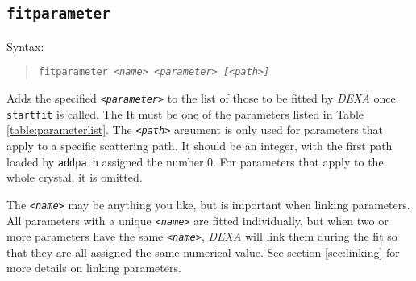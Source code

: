 \documentclass[a4paper,12pt]{report}
\newcommand{\dexa}{\emph{DEXA} }
\begin{document}
\subsection{\texttt{fitparameter}}
Syntax:
\begin{quote}
  \texttt{fitparameter \emph{<name> <parameter> [<path>]}}
\end{quote}
Adds the specified \texttt{\emph{<parameter>}} to the list of those to be fitted by \dexa once \verb|startfit| is called. The  It must be one of the parameters listed in Table \ref{table:parameterlist}. The \texttt{\emph{<path>}} argument is only used for parameters that apply to a specific scattering path. It should be an integer, with the first path loaded by \verb|addpath| assigned the number 0. For parameters that apply to the whole crystal, it is omitted.

The \texttt{\emph{<name>}} may be anything you like, but is important when linking parameters. All parameters with a unique \texttt{\emph{<name>}} are fitted individually, but when two or more parameters have the same \texttt{\emph{<name>}}, \dexa will link them during the fit so that they are all assigned the same numerical value. See section \ref{sec:linking} for more details on linking parameters.
\end{document}
